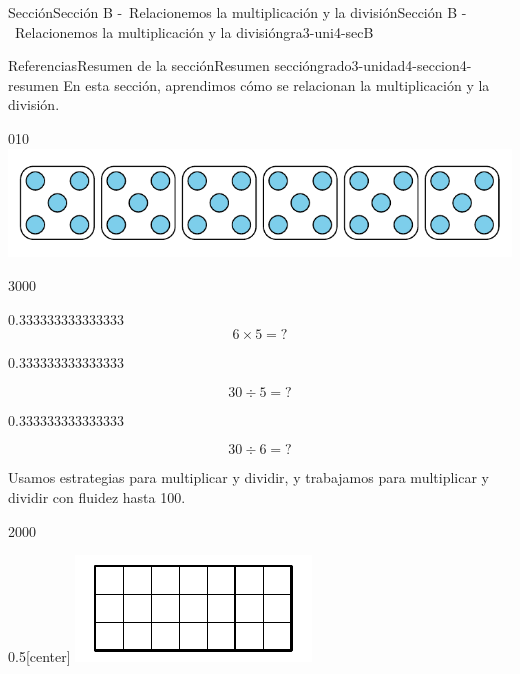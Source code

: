 \documentclass[twoside,10pt,]{article}
\begin{document}
\begin{sectionptx}{Sección}{Sección B -~Relacionemos la multiplicación y la división}{}{Sección B -~Relacionemos la multiplicación y la división}{}{}{gra3-uni4-secB}
\typeout{************************************************}
%
\begin{references-subsection}{Referencias}{Resumen de la sección}{}{Resumen sección}{}{}{grado3-unidad4-seccion4-resumen}
En esta sección, aprendimos cómo se relacionan la multiplicación y la división.%
\begin{image}{0}{1}{0}{}%
\includegraphics[width=\linewidth]{external/svg-source/tikz-file-176322.pdf}
\end{image}%
\begin{sidebyside}{3}{0}{0}{0}%
\begin{sbspanel}{0.333333333333333}%
%
\begin{equation*}
6\times 5={?}
\end{equation*}
%
\end{sbspanel}%
\begin{sbspanel}{0.333333333333333}%
\par
%
\begin{equation*}
30\div 5={?}
\end{equation*}
%
\end{sbspanel}%
\begin{sbspanel}{0.333333333333333}%
\par
%
\begin{equation*}
30\div 6={?}
\end{equation*}
%
\end{sbspanel}%
\end{sidebyside}%
\par
Usamos estrategias para multiplicar y dividir, y trabajamos para multiplicar y dividir con fluidez hasta 100.%
\begin{sidebyside}{2}{0}{0}{0}%
\begin{sbspanel}{0.5}[center]%
\includegraphics[width=\linewidth]{external/svg-source/tikz-file-141807.pdf}

\end{sbspanel}
\end{sidebyside}
\end{references-subsection}
\end{sectionptx}
\end{document}
